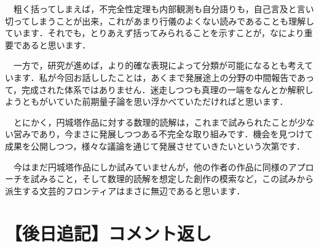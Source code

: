 \documentclass[10pt, a5paper, twoside]{jsarticle}
\begin{document}
\begin{itemize}
			　粗く括ってしまえば，不完全性定理も内部観測も自分語りも，自己言及と言い切ってしまうことが出来，これがあまり行儀のよくない読みであることも理解しています．それでも，とりあえず括ってみられることを示すことが，なにより重要であると思います．

			　一方で，研究が進めば，より的確な表現によって分類が可能になるとも考えています．私が今回お話ししたことは，あくまで発展途上の分野の中間報告であって，完成された体系ではありません．迷走しつつも真理の一端をなんとか解釈しようともがいていた前期量子論を思い浮かべていただければと思います．

			　とにかく，円城塔作品に対する数理的読解は，これまで試みられたことが少ない営みであり，今まさに発展しつつある不完全な取り組みです．機会を見つけて成果を公開しつつ，様々な議論を通じて発展させていきたいという次第です．

			　今はまだ円城塔作品にしか試みていませんが，他の作者の作品に同様のアプローチを試みること，そして数理的読解を想定した創作の模索など，この試みから派生する文芸的フロンティアはまさに無辺であると思います．

		\end{itemize}

	\section{【後日追記】コメント返し}
\end{document}
